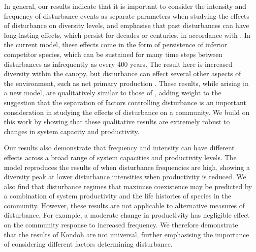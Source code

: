 In general, our results indicate that it is important to consider the intensity and frequency of disturbance events as separate parameters when studying the effects of disturbance on diversity levels, and emphasise that past disturbances can have long-lasting effects, which persist for decades or centuries, in accordance with \cite{foster1999human}. In the current model, these effects come in the form of persistence of inferior competitor species, which can be sustained for many time steps between disturbances as infrequently as every 400 years. The result here is increased diversity within the canopy, but disturbance can effect several other aspects of the environment, such as net primary production \citep[e.g.][]{turner2010disturbance}. These results, while arising in a new model, are qualitatively similar to those of \cite{miller2011frequency}, adding weight to the suggestion that the separation of factors controlling disturbance is an important consideration in studying the effects of disturbance on a community. We build on this work by showing that these qualitative results are extremely robust to changes in system capacity and productivity.

Our results also demonstrate that frequency and intensity can have different effects across a broad range of system capacities and productivity levels. The model reproduces the results of \cite{kondoh2001unifying} when disturbance frequencies are high, showing a diversity peak at lower disturbance intensities  when productivity is reduced. We also find that disturbance regimes that maximise coexistence may be predicted by a combination of system productivity and the life histories of species in the community. However, these results are not applicable to alternative measures of disturbance. For example, a moderate change in productivity has negligible effect on the community response to increased frequency. We therefore demonstrate that the results of Kondoh are not universal, further emphasising the importance of considering different factors determining disturbance.

